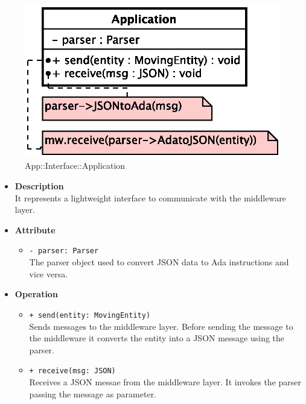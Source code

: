 \begin{figure}[h]
\centering
\includegraphics[scale=0.6,keepaspectratio]{images/solution/application.eps}
\caption{App::Interface::Application}
\label{fig:sd-app-application}
\end{figure}
\FloatBarrier
\begin{itemize}
  \item \textbf{Description} \\
    It represents a lightweight interface to communicate with the middleware layer.
  \item \textbf{Attribute}
  \begin{itemize}
    \item \texttt{- parser: Parser} \\
The parser object used to convert JSON data to Ada instructions and vice versa.
  \end{itemize}
  \item \textbf{Operation}
  \begin{itemize} 
    \item \texttt{+ send(entity: MovingEntity)} \\
Sends messages to the middleware layer. Before sending the message to the
middleware it converts the entity into a JSON message using the parser.
    \item \texttt{+ receive(msg: JSON)} \\
Receives a JSON messae from the middleware layer. It invokes the parser 
passing the message as parameter.
  \end{itemize}
\end{itemize}

